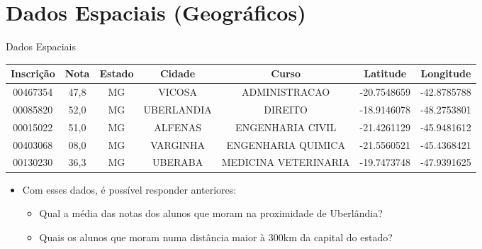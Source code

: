 \section{Dados Espaciais (Geográficos)}
	\begin{frame}{Dados Espaciais}
		\begin{table}
			\centering
			\footnotesize
		    \begin{tabular}{c|c|c|c|c|c|c}
			    \hline 
			    \textbf{Inscrição} & \textbf{Nota} & \textbf{Estado} & \textbf{Cidade}     & \textbf{Curso}                & \textbf{Latitude} & \textbf{Longitude} \\ \hline \hline 
			    00467354  & 47,8 & MG     & VICOSA     & ADMINISTRACAO        & -20.7548659        & -42.8785788         \\\hline 
			    00085820  & 52,0 & MG     & UBERLANDIA & DIREITO              & -18.9146078        & -48.2753801         \\\hline 
			    00015022  & 51,0 & MG     & ALFENAS    & ENGENHARIA CIVIL     & -21.4261129        & -45.9481612         \\\hline 
			    00403068  & 08,0 & MG     & VARGINHA   & ENGENHARIA QUIMICA   & -21.5560521        & -45.4368421         \\\hline 
			    00130230  & 36,3 & MG     & UBERABA    & MEDICINA VETERINARIA & -19.7473748        & -47.9391625         \\\hline 
		    \end{tabular}
		\end{table}
	
			\bigskip
		\begin{itemize}
			\item Com esses dados, é possível responder anteriores:
			\begin{itemize}
				\setlength{\itemsep}{1.2em}
				\it
				\item Qual a média das notas dos alunos que moram na proximidade de Uberlândia?
				\item Quais os alunos que moram numa distância maior à 300km da capital do estado?
			\end{itemize}
		\end{itemize}
	\end{frame}

